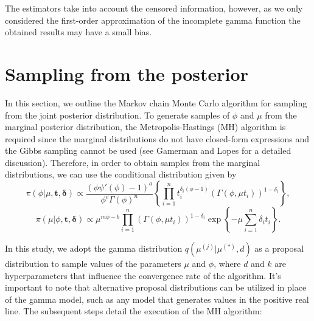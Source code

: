 \documentclass[]{interact}
\theoremstyle{plain}%
\theoremstyle{definition}
\theoremstyle{remark}
\begin{document}
The estimators take into account the censored information, however, as we only considered the first-order approximation of the incomplete gamma function the obtained results may have a small bias.


\section{Sampling from the posterior}

In this section, we outline the Markov chain Monte Carlo algorithm for sampling from the joint posterior distribution.  To generate samples of $\phi$ and $\mu$ from the marginal posterior distribution, {\color{black}the Metropolis-Hastings (MH) algorithm is required since the marginal distributions do not have closed-form expressions and the Gibbs sampling cannot be used (see Gamerman and Lopes \cite{gamerman2006markov} for a detailed discussion)}. Therefore, in order to obtain samples from the marginal distributions, we can use the conditional distribution given by 
\begin{equation}\label{cond1}
\pi(\phi|\mu,\boldsymbol{t,\delta})\propto \frac{(\phi\psi'(\phi)-1)^{a}}{\phi^{c}\Gamma(\phi)^n}\left\{\prod_{i=1}^n{t_i^{\delta_i(\phi-1)}}\left(\Gamma(\phi,\mu t_i)\right)^{1-\delta_i}\right\},
\end{equation}
\begin{equation*}%
\pi(\mu|\phi,\boldsymbol{t,\delta})\propto \mu^{m\phi-b}\prod_{i=1}^n\left(\Gamma(\phi,\mu t_i)\right)^{1-\delta_i}\exp\left\{-\mu\sum_{i=1}^n {\delta_i}t_i\right\}.
\end{equation*}


In this study, we adopt the gamma distribution $q(\mu^{(j)}|\mu^{(*)},d)$ as a proposal distribution to sample values of the parameters $\mu$ and $\phi$, where $d$ and $k$ are hyperparameters that influence the convergence rate of the algorithm. It's important to note that alternative proposal distributions can be utilized in place of the gamma model, such as any model that generates values in the positive real line. The subsequent steps detail the execution of the MH algorithm:
\end{document}
